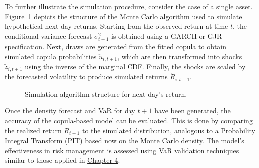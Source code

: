 To further illustrate the simulation procedure, consider the case of a single asset. Figure~\ref{5.5} depicts the structure of the Monte Carlo algorithm used to simulate hypothetical next-day returns. Starting from the observed return at time $t$, the conditional variance forecast $\sigma^2_{t+1}$ is obtained using a GARCH or GJR specification. Next, draws are generated from the fitted copula to obtain simulated copula probabilities $\check{u}_{i,t+1}$, which are then transformed into shocks $\check{z}_{i,t+1}$ using the inverse of the marginal CDF. Finally, the shocks are scaled by the forecasted volatility to produce simulated returns $\check{R}_{i,t+1}$.

\begin{figure}[H]
\centering
{}
\caption{Simulation algorithm structure for next day's return.}
\label{5.5}
\end{figure}
\newpage
Once the density forecast and VaR for day $t+1$ have been generated, the accuracy of the copula-based model can be evaluated. This is done by comparing the realized return $R_{t+1}$ to the simulated distribution, analogous to a Probability Integral Transform (PIT) based now on the Monte Carlo density. The model’s effectiveness in risk management is assessed using VaR validation techniques similar to those applied in \hyperref[chap:4]{Chapter 4}.

